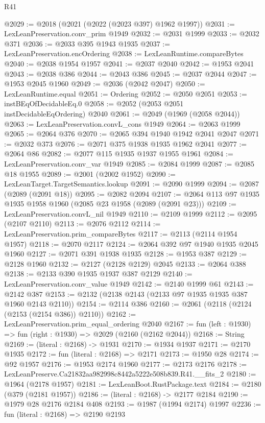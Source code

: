 \begin{lexlean}{R41}
\begin{coremodule}
@2029 := @2018 (@2021 (@2022 (@2023 @397) @1962 @1997))
@2031 := LexLeanPreservation.conv_prim @1949
@2032 := @2031 @1999
@2033 := @2032 @371
@2036 := @2033 @395 @1943 @1935
@2037 := LexLeanPreservation.encOrdering
@2038 := LexLeanRuntime.compareBytes
@2040 := @2038 @1954 @1957
@2041 := @2037 @2040
@2042 := @1953 @2041
@2043 := @2038 @386
@2044 := @2043 @386
@2045 := @2037 @2044
@2047 := @1953 @2045 @1960
@2049 := @2036 (@2042 @2047)
@2050 := LexLeanRuntime.equal
@2051 := Ordering
@2052 := @2050 @2051
@2053 := instBEqOfDecidableEq.{0}
@2058 := @2052 (@2053 @2051 instDecidableEqOrdering) @2040
@2061 := @2049 (@1969 (@2058 @2044))
@2063 := LexLeanPreservation.convL_cons @1949
@2064 := @2063 @1999
@2065 := @2064 @376
@2070 := @2065 @394 @1940 @1942 @2041 @2047
@2071 := @2032 @373
@2076 := @2071 @375 @1938 @1935 @1962 @2041
@2077 := @2064 @86
@2082 := @2077 @115 @1935 @1937 @1955 @1961
@2084 := LexLeanPreservation.conv_var @1949
@2085 := @2084 @1999
@2087 := @2085 @18 @1955
@2089 := @2001 (@2002 @1952)
@2090 := LexLeanTarget.TargetSemantics.lookup
@2091 := @2090 @1999
@2094 := @2087 (@2089 (@2091 @18))
@2095 := @2082 @2094
@2107 := @2064 @113 @97 @1935 @1935 @1958 @1960 (@2085 @23 @1958 (@2089 (@2091 @23)))
@2109 := LexLeanPreservation.convL_nil @1949
@2110 := @2109 @1999
@2112 := @2095 (@2107 @2110)
@2113 := @2076 @2112
@2114 := LexLeanPreservation.prim_compareBytes
@2117 := @2113 (@2114 @1954 @1957)
@2118 := @2070 @2117
@2124 := @2064 @392 @97 @1940 @1935 @2045 @1960
@2127 := @2071 @391 @1938 @1935
@2128 := @1953 @387
@2129 := @2128 @1960
@2132 := @2127 (@2128 @2129) @2045
@2133 := @2064 @388
@2138 := @2133 @390 @1935 @1937 @387 @2129
@2140 := LexLeanPreservation.conv_value @1949
@2142 := @2140 @1999 @61
@2143 := @2142 @387
@2153 := @2132 (@2138 @2143 (@2133 @97 @1935 @1935 @387 @1960 @2143 @2110))
@2154 := @2114 @386
@2160 := @2061 (@2118 (@2124 (@2153 (@2154 @386)) @2110))
@2162 := LexLeanPreservation.prim_equal_ordering @2040
@2167 := fun (left : @1930) => fun (right : @1930) => @2029 (@2160 (@2162 @2044))
@2168 := String
@2169 := (literal : @2168) -> @1931
@2170 := @1934 @1937
@2171 := @2170 @1935
@2172 := fun (literal : @2168) => @2171
@2173 := @1950 @28
@2174 := @92 @1957
@2176 := @1953 @2174 @1960
@2177 := @2173 @2176
@2178 := LexLeanPreserve.Ca21832aa982998c8442a5222e508b839.R41.__fits_2
@2180 := @1964 (@2178 @1957)
@2181 := LexLeanBoot.RustPackage.text
@2184 := @2180 (@379 (@2181 @1957))
@2186 := (literal : @2168) -> @2177 @2184
@2190 := @1979 @28 @2176 @2184 @408
@2193 := @1987 (@1994 @2174) @1997
@2236 := fun (literal : @2168) =>
  @2190
    @2193

\end{coremodule}
\end{lexlean}
